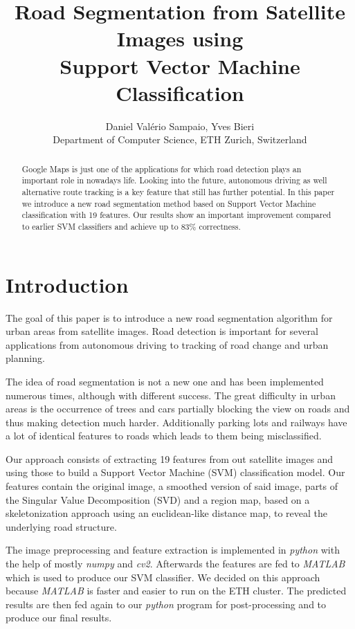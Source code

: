 \documentclass[10pt,conference,compsocconf]{IEEEtran}
\begin{document}
\title{Road Segmentation from Satellite Images using\\Support Vector Machine Classification}

\author{
  Daniel Val\'erio Sampaio, Yves Bieri\\
  Department of Computer Science, ETH Zurich, Switzerland
}

\maketitle

\begin{abstract}
Google Maps is just one of the applications for which road detection plays an important role in nowadays life. Looking into the future, autonomous driving as well alternative route tracking is a key feature that still has further potential. In this paper we introduce a new road segmentation method based on Support Vector Machine classification with 19 features. Our results show an important improvement compared to earlier SVM classifiers and achieve up to 83\% correctness.
\end{abstract}

\section{Introduction}

The goal of this paper is to introduce a new road segmentation algorithm for urban areas from satellite images. Road detection is important for several applications from autonomous driving to tracking
of road change and urban planning.

The idea of road segmentation is not a new one and has been implemented numerous times, although with
different success. The great difficulty in urban areas is the occurrence of trees and cars partially blocking the view on roads and thus making detection much harder. Additionally parking lots and railways have a lot of identical features to roads which leads to them being misclassified.

Our approach consists of extracting 19 features from out satellite images and using those to build a Support Vector Machine (SVM) classification model. Our features contain the original image, a smoothed version of said image, parts of the Singular Value Decomposition (SVD) and a region map, based on a skeletonization approach using an euclidean-like distance map, to reveal the underlying road structure.

The image preprocessing and feature extraction is implemented in \emph{python} with the help of mostly \emph{numpy} and \emph{cv2}. Afterwards the features are fed to \emph{MATLAB} which is used to produce our SVM classifier. We decided on this approach because \emph{MATLAB} is faster and easier to run on the ETH cluster. The predicted results are then fed again to our \emph{python} program for post-processing and to produce our final results.
\end{document}
